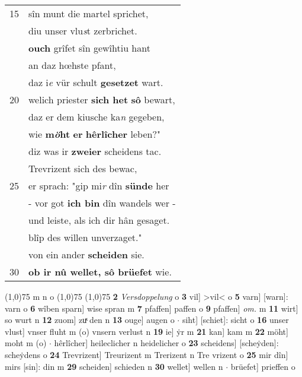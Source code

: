\documentclass[8pt,a4paper,notitlepage]{article}
\begin{document}
\begin{table}[ht]
\begin{minipage}[t]{0.5\linewidth}
\begin{tabular}{rl}
15 & sîn munt die martel sprichet,\\ 
 & diu unser vlu\textit{s}t zerbrichet.\\ 
 & \textbf{ouch} grîfet sîn gewîhtiu hant\\ 
 & an daz hœhste pfant,\\ 
 & daz i\textit{e} vür schult \textbf{gesetzet} wart.\\ 
20 & welich priester \textbf{sich het} \textbf{sô} bewart,\\ 
 & daz er dem kiusche ka\textit{n} gegeben,\\ 
 & wie \textbf{m\textit{ö}ht} \textbf{er} \textbf{hêrlîcher} leben?"\\ 
 & diz was ir \textbf{zweier} scheidens tac.\\ 
 & Trevrizent sich des bewac,\\ 
25 & er sprach: "gip mi\textit{r} dîn \textbf{sünde} her\\ 
 & - vor got \textbf{ich bin} dîn wandels wer -\\ 
 & und leiste, als ich dir hân gesaget.\\ 
 & blîp des willen unverzaget."\\ 
 & von ein ander \textbf{scheiden} sie.\\ 
30 & \textbf{ob ir nû wellet, sô brüefet} wie.\\ 
\end{tabular}
\scriptsize
\line(1,0){75} \newline
m n o \newline
\line(1,0){75} \newline
\newline
\line(1,0){75} \newline
\textbf{2} \textit{Versdoppelung} o  \textbf{3} vil] >vil< o \textbf{5} varn] [warn]: varn o \textbf{6} wîben sparn] wise spran m \textbf{7} pfaffen] paffen o \textbf{9} pfaffen] \textit{om.} m \textbf{11} wirt] so wurt n \textbf{12} zuom] zuͯ den n \textbf{13} ouge] augen o  $\cdot$ siht] [schiet]: sicht o \textbf{16} unser vlust] vnser fluht m (o) vnsern verlust n \textbf{19} ie] ẏr m \textbf{21} kan] kam m \textbf{22} möht] moht m (o)  $\cdot$ hêrlîcher] heileclicher n heidelicher o \textbf{23} scheidens] [scheẏden]: scheẏdens o \textbf{24} Trevrizent] Treurizent m Trerizent n Tre vrizent o \textbf{25} mir dîn] mirs [sin]: din m \textbf{29} scheiden] schieden n \textbf{30} wellet] wellen n  $\cdot$ brüefet] prieffen o \newline
\end{minipage}
\end{table}
\end{document}
